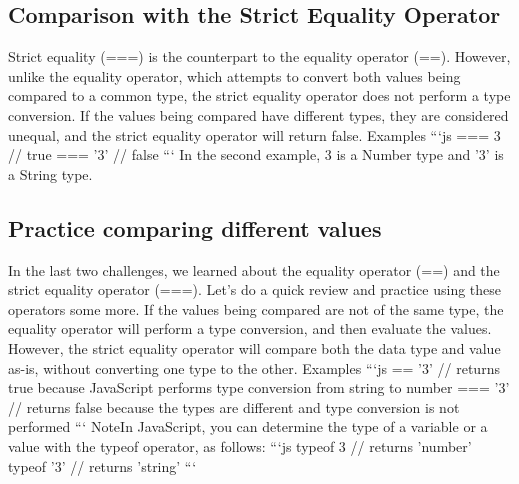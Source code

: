 \documentclass{article}%
\begin{document}
\subsection{Comparison with the Strict Equality Operator}%
\label{subsec:ComparisonwiththeStrictEqualityOperator}%
Strict equality (===) is the counterpart to the equality operator (==). However, unlike the equality operator, which attempts to convert both values being compared to a common type, the strict equality operator does not perform a type conversion.\newline%
If the values being compared have different types, they are considered unequal, and the strict equality operator will return false.\newline%
Examples\newline%
```js ===  3   // true === '3'  // false\newline%
```\newline%
In the second example, 3 is a Number type and '3' is a String type.\newline%

%
\subsection{Practice comparing different values}%
\label{subsec:Practicecomparingdifferentvalues}%
In the last two challenges, we learned about the equality operator (==) and the strict equality operator (===). Let's do a quick review and practice using these operators some more.\newline%
If the values being compared are not of the same type, the equality operator will perform a type conversion, and then evaluate the values. However, the strict equality operator will compare both the data type and value as{-}is, without converting one type to the other.\newline%
Examples\newline%
```js == '3'  // returns true because JavaScript performs type conversion from string to number === '3' // returns false because the types are different and type conversion is not performed\newline%
```\newline%
NoteIn JavaScript, you can determine the type of a variable or a value with the typeof operator, as follows:\newline%
```js\newline%
typeof 3   // returns 'number'\newline%
typeof '3' // returns 'string'\newline%
```\newline%
\end{document}
